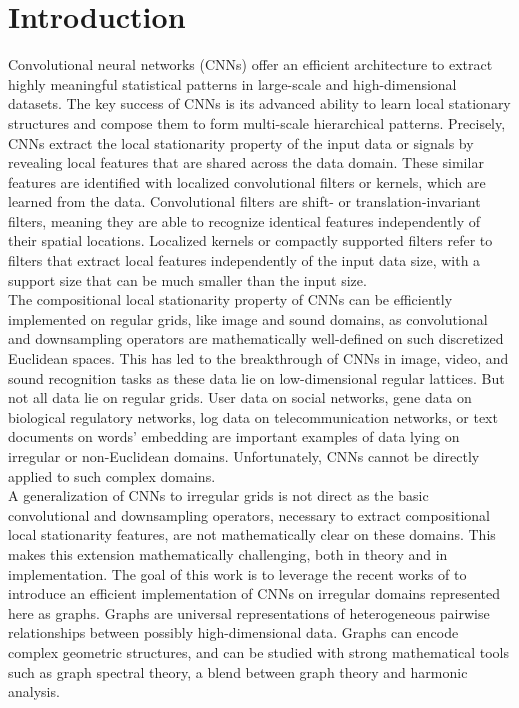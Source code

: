\documentclass{article}
\begin{document}
\section{Introduction}
\vspace{-0.2cm}
Convolutional neural networks (CNNs) \cite{pro:LeCunBottouBengioHaffner98MNIST} offer an efficient architecture to extract highly meaningful statistical patterns in large-scale and high-dimensional datasets. The key success of CNNs is its advanced ability to learn local stationary structures and compose them to form multi-scale hierarchical patterns. Precisely, CNNs extract the local stationarity property of the input data or signals by revealing local features that are shared across the data domain. These similar features are identified with localized convolutional filters or kernels, which are learned from the data. Convolutional filters are shift- or translation-invariant filters, meaning they are able to recognize identical features independently of their spatial locations. Localized kernels or compactly supported filters refer to filters that extract local features independently of the input data size, with a support size that can be much smaller than the input size. \\
The compositional local stationarity property of CNNs can be efficiently implemented on regular grids, like image and sound domains, as convolutional and downsampling operators are mathematically well-defined on such discretized Euclidean spaces. This has led to the breakthrough of CNNs in image, video, and sound recognition tasks \cite{art:LeCunBengioHinton15DL} as these data lie on low-dimensional regular lattices. But not all data lie on regular grids. User data on social networks, gene data on biological regulatory networks, log data on telecommunication networks, or text documents on words' embedding are important examples of data lying on irregular or non-Euclidean domains. Unfortunately, CNNs cannot be directly applied to such complex domains.\\
A generalization of CNNs to irregular grids is not direct as the basic convolutional and downsampling operators, necessary to extract compositional local stationarity features, are not mathematically clear on these domains. This makes this extension mathematically challenging, both in theory and in implementation. The goal of this work is to leverage the recent works of \cite{pro:GregorLeCun10LRF,pro:CoatesNg11LRF,art:BrunaZarembaSzlamLeCun13DLgraphs,art:HenaffBrunaLeCun15DLgraphs,art:HammondVandergheynstGribonval11GraphWav,art:ShumanNarangFrossardOrtegaVandergheynst13ReviewSPG,art:ShumanRicaudVandergheynst16Local} to introduce an efficient implementation of CNNs on irregular domains represented here as graphs. Graphs are universal representations of heterogeneous pairwise relationships between possibly high-dimensional data. Graphs can encode complex geometric structures, and can be studied with strong mathematical tools such as graph spectral theory, a blend between graph theory and harmonic analysis.\\
\end{document}
